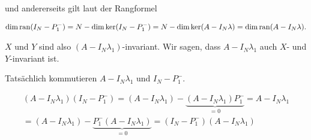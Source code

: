 \begin{remark}
    und andererseits gilt laut der Rangformel

    \begin{align*}
        \dim \operatorname{ran} (I_N - P_1^-)
        =
        N - \dim \ker (I_N - P_1^-)
        =
        N - \dim \ker (A - I_N \lambda)
        =
        \dim \operatorname{ran} (A - I_N \lambda).
    \end{align*}

    $X$ und $Y$ sind also $(A - I_N \lambda_1)$-invariant.
    Wir sagen, dass $A - I_N \lambda_1$ auch $X$- und $Y$-invariant ist.

    Tatsächlich kommutieren $A - I_N \lambda_1$ und $I_N - P_1^-$.

    \begin{multline*}
        (A - I_N \lambda_1) (I_N - P_1^-)
        =
        (A - I_N \lambda_1) - \underbrace{(A - I_N \lambda_1) P_1^-}_{=0}
        =
        A - I_N \lambda_1 \\
        =
        (A - I_N \lambda_1) - \underbrace{P_1^- (A - I_N \lambda_1)}_{=0}
        =
        (I_N - P_1^-) (A - I_N \lambda_1)
    \end{multline*}

\end{remark}
